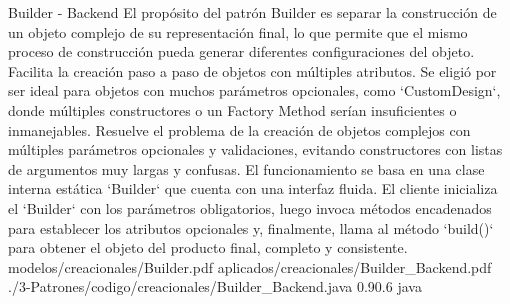 \Patron
    {Builder - Backend}
    {El propósito del patrón Builder es separar la construcción de un objeto complejo de su representación final, lo que permite que el mismo proceso de construcción pueda generar diferentes configuraciones del objeto. Facilita la creación paso a paso de objetos con múltiples atributos. Se eligió por ser ideal para objetos con muchos parámetros opcionales, como `CustomDesign`, donde múltiples constructores o un Factory Method serían insuficientes o inmanejables.}
    {Resuelve el problema de la creación de objetos complejos con múltiples parámetros opcionales y validaciones, evitando constructores con listas de argumentos muy largas y confusas. El funcionamiento se basa en una clase interna estática `Builder` que cuenta con una interfaz fluida. El cliente inicializa el `Builder` con los parámetros obligatorios, luego invoca métodos encadenados para establecer los atributos opcionales y, finalmente, llama al método `build()` para obtener el objeto del producto final, completo y consistente.}
    {modelos/creacionales/Builder.pdf}
    {aplicados/creacionales/Builder_Backend.pdf}
    {./3-Patrones/codigo/creacionales/Builder_Backend.java}
    {0.9}{0.6}
    {java}
\newpage

